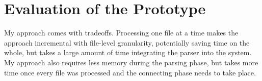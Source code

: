 \chapter{Evaluation of the Prototype}
\label{chap:evaluation-of-the-prototype}

My approach comes with tradeoffs. Processing one file at a time makes the approach incremental with file-level granularity, potentially saving time on the whole, but takes a large amount of time integrating the parser into the system. My approach also requires less memory during the parsing phase, but takes more time once every file was processed and the connecting phase needs to take place.
